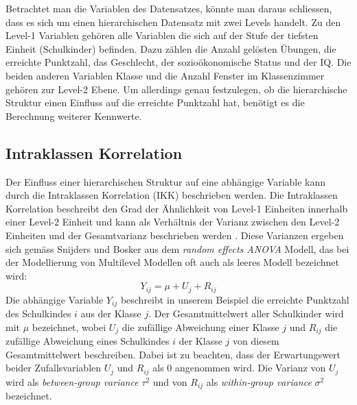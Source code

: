 \documentclass[12pt]{article}\usepackage[]{graphicx}\usepackage[]{color}
\numberwithin{equation}{section}
\begin{document}
Betrachtet man die Variablen des Datensatzes, könnte man daraus schliessen, dass es sich um einen hierarchischen Datensatz mit zwei Levels handelt. Zu den Level-1 Variablen gehören alle Variablen die sich auf der Stufe der tiefsten Einheit (Schulkinder) befinden. Dazu zählen die Anzahl gelösten Übungen, die erreichte Punktzahl, das Geschlecht, der sozioökonomische Status und der IQ. Die beiden anderen Variablen Klasse und die Anzahl Fenster im Klassenzimmer gehören zur Level-2 Ebene. Um allerdings genau festzulegen, ob die hierarchische Struktur einen Einfluss auf die erreichte Punktzahl hat, benötigt es die Berechnung weiterer Kennwerte. 

\subsection{Intraklassen Korrelation} \label{section:icc}
Der Einfluss einer hierarchischen Struktur auf eine abhängige Variable kann durch die Intraklassen Korrelation (IKK) beschrieben werden. Die Intraklassen Korrelation beschreibt den Grad der Ähnlichkeit von Level-1 Einheiten innerhalb einer Level-2 Einheit und kann als Verhältnis der Varianz zwischen den Level-2 Einheiten und der Gesamtvarianz beschrieben werden \citep{FieldAndy2013DsuR, SnijdersTomA.B2012Ma:a, twisk_2006}. Diese Varianzen ergeben sich gemäss Snijders und Bosker \citeyearpar{SnijdersTomA.B2012Ma:a} aus dem \textit{random effects ANOVA} Modell, das bei der Modellierung von Multilevel Modellen oft auch als leeres Modell bezeichnet wird:
\begin{equation} \label{eq:empty_model}
Y_{ij} = \mu + U_{j} + R_{ij}
\end{equation}
Die abhängige Variable $Y_{ij}$ beschreibt in unserem Beispiel die erreichte Punktzahl des Schulkindes $i$ aus der Klasse $j$. Der Gesamtmittelwert aller Schulkinder wird mit $\mu$ bezeichnet, wobei $U_{j}$ die zufällige Abweichung einer Klasse $j$ und $R_{ij}$ die zufällige Abweichung eines Schulkindes $i$ der Klasse $j$ von diesem Gesamtmittelwert beschreiben. Dabei ist zu beachten, dass der Erwartungswert beider Zufallsvariablen $U_{j}$ und $R_{ij}$ als 0 angenommen wird. Die Varianz von $U_{j}$ wird als \textit{between-group variance} $\tau^2$ und von $R_{ij}$ als \textit{within-group variance} $\sigma^2$ bezeichnet.
\end{document}
